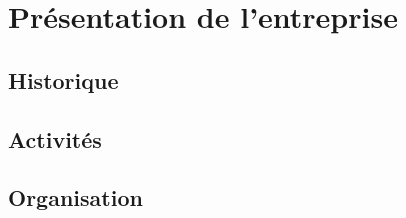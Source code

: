 \chapter{Présentation de l'entreprise}\label{ch:presentation-de-l'entreprise}

\section{Historique}\label{sec:historique}

\section{Activités}\label{sec:activites}

\section{Organisation}\label{sec:organisation}

\cleardoublepage